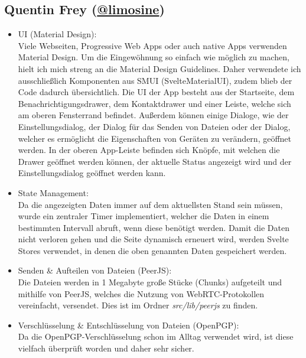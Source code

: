 \documentclass[a4paper]{article}
\begin{document}
\subsection{Quentin Frey (\href{https://github.com/limosine}{@limosine})}
\begin{itemize}
      \item UI (Material Design):\\
            Viele Webseiten, Progressive Web Apps oder auch native Apps
            verwenden Material Design. Um die Eingewöhnung so einfach wie
            möglich zu machen, hielt ich mich streng an die Material Design
            Guidelines. Daher verwendete ich ausschließlich Komponenten aus SMUI
            (SvelteMaterialUI), zudem blieb der Code dadurch übersichtlich. Die
            UI der App besteht aus der Startseite, dem Benachrichtigungsdrawer,
            dem Kontaktdrawer und einer Leiste, welche sich am oberen
            Fensterrand befindet. Außerdem können einige Dialoge, wie der
            Einstellungsdialog, der Dialog für das Senden von Dateien oder der
            Dialog, welcher es ermöglicht die Eigenschaften von Geräten zu
            verändern, geöffnet werden. In der oberen App-Leiste befinden sich
            Knöpfe, mit welchen die Drawer geöffnet werden können, der aktuelle
            Status angezeigt wird und der Einstellungsdialog geöffnet werden
            kann.
      \item State Management:\\
            Da die angezeigten Daten immer auf dem aktuellsten Stand sein
            müssen, wurde ein zentraler Timer implementiert, welcher die Daten
            in einem bestimmten Intervall abruft, wenn diese benötigt werden.
            Damit die Daten nicht verloren gehen und die Seite dynamisch
            erneuert wird, werden Svelte Stores verwendet, in denen die oben
            genannten Daten gespeichert werden.
      \item Senden \& Aufteilen von Dateien (PeerJS):\\
            Die Dateien werden in 1 Megabyte große Stücke (Chunks) aufgeteilt
            und mithilfe von PeerJS, welches die Nutzung von WebRTC-Protokollen
            vereinfacht, versendet. Dies ist im Ordner \textit{src/lib/peerjs}
            zu finden.
      \item Verschlüsselung \& Entschlüsselung von Dateien (OpenPGP):\\
            Da die OpenPGP-Verschlüsselung schon im Alltag verwendet wird, ist
            diese vielfach überprüft worden und daher sehr sicher.

\end{itemize}
\end{document}
